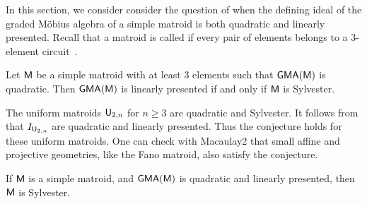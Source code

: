 In this section, we consider consider the question of when the defining ideal of the graded M\"obius algebra of a simple matroid is both quadratic and linearly presented.  Recall that a matroid is called  if every pair of elements belongs to a 3-element circuit~\cite{Murty70}.

\begin{conjecture}\label{conj:Sylv_iff_lin_pres}
    Let $\mathsf{M}$ be a simple matroid with at least $3$ elements such that $\mathsf{GMA}(\mathsf{M})$ is quadratic. Then $\mathsf{GMA}(\mathsf{M})$ is linearly presented   if and only if  $\mathsf{M}$ is Sylvester.
\end{conjecture}

\noindent The uniform matroids $\mathsf{U}_{2,n}$ for $n \ge 3$ are quadratic and Sylvester.  It follows from  that $I_{\mathsf{U}_{2,n}}$ are quadratic and linearly presented.  Thus the conjecture holds for these uniform matroids.  One can check with Macaulay2 that small affine and projective geometries, like the Fano matroid, also satisfy the conjecture.

\begin{proposition}\label{prop:linpres:Sylvester}
    If $\mathsf{M}$ is a simple matroid, and $\mathsf{GMA}(\mathsf{M})$ is quadratic and linearly presented, then $\mathsf{M}$ is Sylvester.
\end{proposition}
